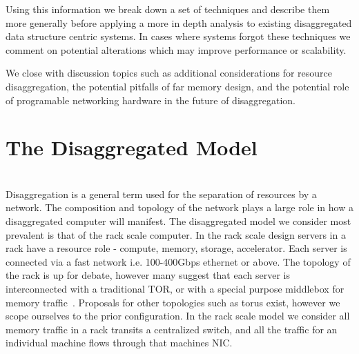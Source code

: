 Using this information we break down a set of techniques and describe them more
generally before applying a more in depth analysis to existing disaggregated
data structure centric systems. In cases where systems forgot these techniques
we comment on potential alterations which may improve performance or
scalability.

We close with discussion topics such as additional considerations for resource
disaggregation, the potential pitfalls of far memory design, and the potential
role of programable networking hardware in the future of disaggregation.





\section{The Disaggregated Model}

\\
Disaggregation is a general term used for the separation
of resources by a network. The composition and topology of the network plays a
large role in how a disaggregated computer will manifest. The disaggregated
model we consider most prevalent is that of the rack scale computer. In the rack
scale design servers in a rack have a resource role - compute, memory, storage,
accelerator. Each server is connected via a fast network i.e. 100-400Gbps
ethernet or above. The topology of the rack is up for debate, however many
suggest that each server is interconnected with a traditional TOR, or with a
special purpose middlebox for memory traffic~\cite{disandapp}. Proposals for
other topologies such as torus exist, however we scope ourselves to the prior
configuration. In the rack scale model we consider all memory traffic in a rack
transits a centralized switch, and all the traffic for an individual machine
flows through that machines NIC.


